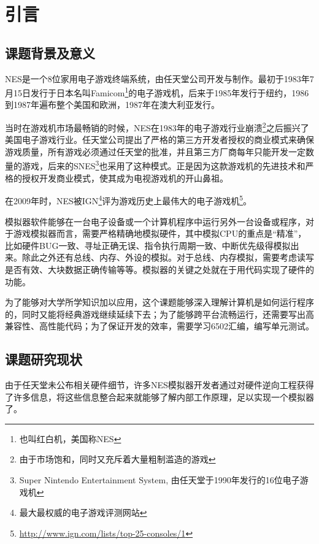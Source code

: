 \documentclass[a4paper]{ltxdoc}
\begin{document}
{
\setcounter{page}{1}
\pretocmd{\section}{\clearpage \vspace*{-2.0em}}{}{}

\setlength{\parindent}{2em}
\setlength{\parskip}{0.5em}
\setlength{\baselineskip}{22pt}

\section{引言}
\subsection{课题背景及意义}
NES是一个8位家用电子游戏终端系统，由任天堂公司开发与制作。最初于1983年7月15日发行于日本名叫Famicom\footnote{也叫红白机，美国称NES}的电子游戏机，后来于1985年发行于纽约，1986到1987年遍布整个美国和欧洲，1987年在澳大利亚发行。

当时在游戏机市场最畅销的时候，NES在1983年的电子游戏行业崩溃\footnote{由于市场饱和，同时又充斥着大量粗制滥造的游戏}之后振兴了美国电子游戏行业。任天堂公司提出了严格的第三方开发者授权的商业模式来确保游戏质量，所有游戏必须通过任天堂的批准，并且第三方厂商每年只能开发一定数量的游戏，后来的SNES\footnote{Super Nintendo Entertainment System, 由任天堂于1990年发行的16位电子游戏机}也采用了这种模式。正是因为这款游戏机的先进技术和严格的授权开发商业模式，使其成为电视游戏机的开山鼻祖。


在2009年时，NES被IGN\footnote{最大最权威的电子游戏评测网站}评为游戏历史上最伟大的电子游戏机\footnote{\url{http://www.ign.com/lists/top-25-consoles/1}}。

模拟器软件能够在一台电子设备或一个计算机程序中运行另外一台设备或程序，对于游戏模拟器而言，需要严格精确地模拟硬件，其中模拟CPU的重点是“精准”，比如硬件BUG一致、寻址正确无误、指令执行周期一致、中断优先级得模拟出来。除此之外还有总线、内存、外设的模拟。对于总线、内存模拟，需要考虑读写是否有效、大块数据正确传输等等。模拟器的关键之处就在于用代码实现了硬件的功能。

为了能够对大学所学知识加以应用，这个课题能够深入理解计算机是如何运行程序的，同时又能将经典游戏继续延续下去；为了能够跨平台流畅运行，还需要写出高兼容性、高性能代码；为了保证开发的效率，需要学习6502汇编，编写单元测试。

\subsection{课题研究现状}
由于任天堂未公布相关硬件细节，许多NES模拟器开发者通过对硬件逆向工程获得了许多信息，将这些信息整合起来就能够了解内部工作原理，足以实现一个模拟器了。

}
\end{document}
